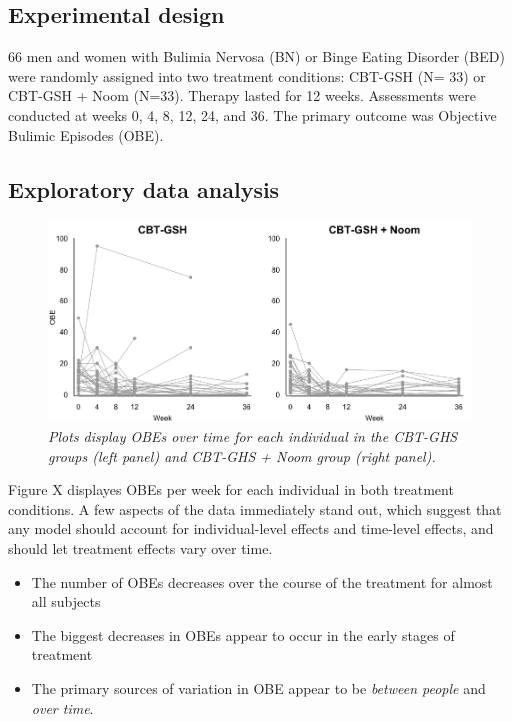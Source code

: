 \documentclass[12pt, oneside]{article}
\begin{document}
\subsection{Experimental design}

66 men and women with Bulimia Nervosa (BN) or Binge Eating Disorder (BED) were randomly assigned into two treatment conditions: CBT-GSH (N= 33) or CBT-GSH + Noom (N=33).  Therapy lasted for 12 weeks.  Assessments were conducted at weeks 0, 4, 8, 12, 24, and 36.  The primary outcome was Objective Bulimic Episodes (OBE).  

\subsection{Exploratory data analysis}

\begin{figure}
\centering
\includegraphics[width=\textwidth, height=\textheight, keepaspectratio]{Noom_paths.png}
\caption{\emph{Plots display OBEs over time for each individual in the CBT-GHS groups (left panel) and CBT-GHS + Noom group (right panel).}}
\end{figure}

Figure X displayes OBEs per week for each individual in both treatment conditions.  A few aspects of the data immediately stand out, which suggest that any model should account for individual-level effects and time-level effects, and should let treatment effects vary over time.  
\begin{itemize}
\item{The number of OBEs decreases over the course of the treatment for almost all subjects}
\item{The biggest decreases in OBEs appear to occur in the early stages of treatment}
\item{The primary sources of variation in OBE appear to be \emph{between people} and \emph{over time}.}
\end{itemize}
\end{document}
